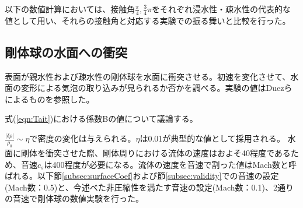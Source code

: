 \documentclass[]{jsarticle}
\begin{document}
以下の数値計算においては、接触角$\frac{\pi}{4},\frac{3}{4}\pi$をそれぞれ浸水性・疎水性の代表的な値として用い、それらの接触角と対応する実験での振る舞いと比較を行った。


\newpage
\subsection{剛体球の水面への衝突}
表面が親水性および疎水性の剛体球を水面に衝突させる。初速を変化させて、水面の変形による気泡の取り込みが見られるか否かを調べる。実験の値はDuez\cite{Duez2007}らによるものを参照した。

式(\ref{eqn:Tait})における係数Bの値について議論する。

$\frac{\left| \delta \rho \right|}{\rho_0}\sim\eta$で密度の変化は与えられる。$\eta$は0.01が典型的な値として採用される\cite{Becker2007}。
水面に剛体を衝突させた際、剛体周りにおける流体の速度はおよそ40程度であるため、音速$c_s$は400程度が必要になる。流体の速度を音速で割った値はMach数と呼ばれる。以下節\ref{subsec:surfaceCoef}および節\ref{subsec:validity}での音速の設定(Mach数：0.5)と、今述べた非圧縮性を満たす音速の設定(Mach数：0.1)、2通りの音速で剛体球の数値実験を行った。
\end{document}
